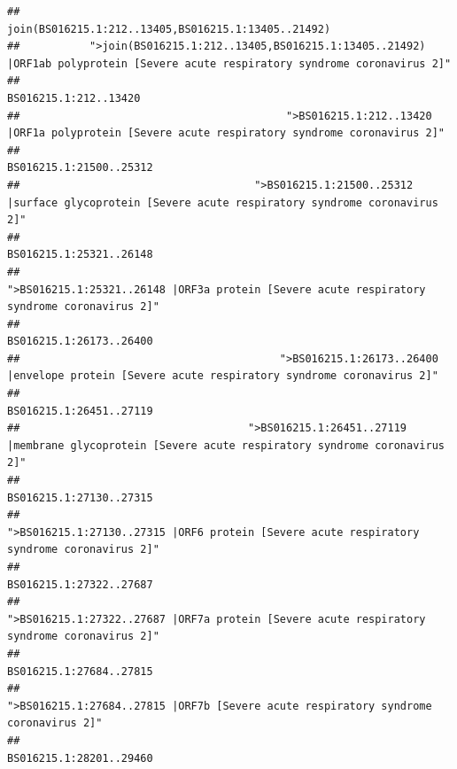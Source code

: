 \documentclass[
]{article}
\begin{document}
\begin{verbatim}
##                                                                                    join(BS016215.1:212..13405,BS016215.1:13405..21492) 
##           ">join(BS016215.1:212..13405,BS016215.1:13405..21492) |ORF1ab polyprotein [Severe acute respiratory syndrome coronavirus 2]" 
##                                                                                                                  BS016215.1:212..13420 
##                                          ">BS016215.1:212..13420 |ORF1a polyprotein [Severe acute respiratory syndrome coronavirus 2]" 
##                                                                                                                BS016215.1:21500..25312 
##                                     ">BS016215.1:21500..25312 |surface glycoprotein [Severe acute respiratory syndrome coronavirus 2]" 
##                                                                                                                BS016215.1:25321..26148 
##                                            ">BS016215.1:25321..26148 |ORF3a protein [Severe acute respiratory syndrome coronavirus 2]" 
##                                                                                                                BS016215.1:26173..26400 
##                                         ">BS016215.1:26173..26400 |envelope protein [Severe acute respiratory syndrome coronavirus 2]" 
##                                                                                                                BS016215.1:26451..27119 
##                                    ">BS016215.1:26451..27119 |membrane glycoprotein [Severe acute respiratory syndrome coronavirus 2]" 
##                                                                                                                BS016215.1:27130..27315 
##                                             ">BS016215.1:27130..27315 |ORF6 protein [Severe acute respiratory syndrome coronavirus 2]" 
##                                                                                                                BS016215.1:27322..27687 
##                                            ">BS016215.1:27322..27687 |ORF7a protein [Severe acute respiratory syndrome coronavirus 2]" 
##                                                                                                                BS016215.1:27684..27815 
##                                                    ">BS016215.1:27684..27815 |ORF7b [Severe acute respiratory syndrome coronavirus 2]" 
##                                                                                                                BS016215.1:28201..29460 

\end{verbatim}
\end{document}
